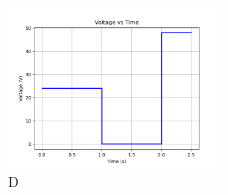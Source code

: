 \documentclass{article}
\begin{document}
\begin{enumerate}
    \begin{figure}[h!]
    \centering
      \hspace{-1cm}
      \includegraphics[width=0.5\textwidth]{Figure_5.png}
      \caption{D}
      \label{fig:your_label}
    \end{figure}

    
    


   
   
\end{enumerate}
\end{document}
